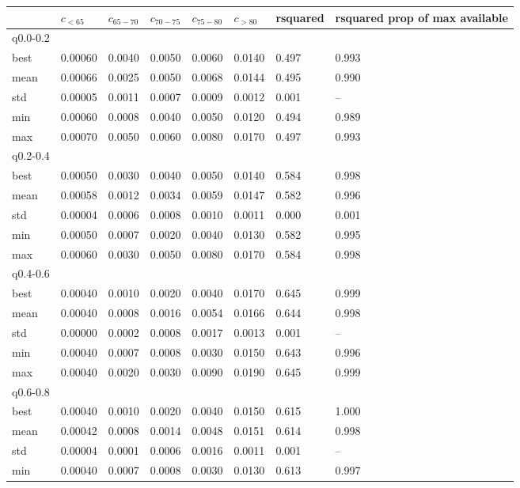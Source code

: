 \documentclass[12pt]{extarticle}
\begin{document}
\begin{table}[h]
\centering
\begin{tabular}{l l l l l l l l}
 & $c_{<65}$ & $c_{65-70}$ & $c_{70-75}$ & $c_{75-80}$ & $c_{>80}$ & rsquared & rsquared prop of max available \\
 \hline
q0.0-0.2 &  &  &  &  &  &  &  \\
best & 0.00060 & 0.0040 & 0.0050 & 0.0060 & 0.0140 & 0.497 & 0.993 \\
mean & 0.00066 & 0.0025 & 0.0050 & 0.0068 & 0.0144 & 0.495 & 0.990 \\
std & 0.00005 & 0.0011 & 0.0007 & 0.0009 & 0.0012 & 0.001 & -- \\
min & 0.00060 & 0.0008 & 0.0040 & 0.0050 & 0.0120 & 0.494 & 0.989 \\
max & 0.00070 & 0.0050 & 0.0060 & 0.0080 & 0.0170 & 0.497 & 0.993 \\
q0.2-0.4 &  &  &  &  &  &  &  \\
best & 0.00050 & 0.0030 & 0.0040 & 0.0050 & 0.0140 & 0.584 & 0.998 \\
mean & 0.00058 & 0.0012 & 0.0034 & 0.0059 & 0.0147 & 0.582 & 0.996 \\
std & 0.00004 & 0.0006 & 0.0008 & 0.0010 & 0.0011 & 0.000 & 0.001 \\
min & 0.00050 & 0.0007 & 0.0020 & 0.0040 & 0.0130 & 0.582 & 0.995 \\
max & 0.00060 & 0.0030 & 0.0050 & 0.0080 & 0.0170 & 0.584 & 0.998 \\
q0.4-0.6 &  &  &  &  &  &  &  \\
best & 0.00040 & 0.0010 & 0.0020 & 0.0040 & 0.0170 & 0.645 & 0.999 \\
mean & 0.00040 & 0.0008 & 0.0016 & 0.0054 & 0.0166 & 0.644 & 0.998 \\
std & 0.00000 & 0.0002 & 0.0008 & 0.0017 & 0.0013 & 0.001 & -- \\
min & 0.00040 & 0.0007 & 0.0008 & 0.0030 & 0.0150 & 0.643 & 0.996 \\
max & 0.00040 & 0.0020 & 0.0030 & 0.0090 & 0.0190 & 0.645 & 0.999 \\
q0.6-0.8 &  &  &  &  &  &  &  \\
best & 0.00040 & 0.0010 & 0.0020 & 0.0040 & 0.0150 & 0.615 & 1.000 \\
mean & 0.00042 & 0.0008 & 0.0014 & 0.0048 & 0.0151 & 0.614 & 0.998 \\
std & 0.00004 & 0.0001 & 0.0006 & 0.0016 & 0.0011 & 0.001 & -- \\
min & 0.00040 & 0.0007 & 0.0008 & 0.0030 & 0.0130 & 0.613 & 0.997 \\

\end{tabular}
\end{table}
\end{document}
